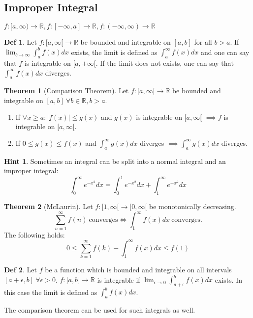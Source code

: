 \documentclass[a4paper, 10pt]{article}
\theoremstyle{definition}
\newtheorem*{definition}{Def}
\newtheorem*{note_wrapper}{Hint}
\theoremstyle{named}
\newtheorem*{ntheorem_wrapper}{Theorem}
\newenvironment{ntheorem}%
    {\begin{mdframed}[style=important]\begin{ntheorem_wrapper}}%
    {\end{ntheorem_wrapper}\end{mdframed}}
\newenvironment{note}%
    {\begin{mdframed}[style=trick]\begin{note_wrapper}}%
    {\end{note_wrapper}\end{mdframed}}
\newcommand{\R}{\mathbb{R}}
\begin{document}
\subsection{Improper Integral}
\begin{center}
    $f: [a, \infty) \to \R, f: [-\infty, a] \to \R, f: (-\infty, \infty) \to \R$
\end{center}

\begin{definition}
    Let $f: [a, \infty[ \to \R$ be bounded and integrable on $[a, b]$ for all $b > a$. If $\lim_{b \to \infty} \int_a^b f(x) dx$ exists, the limit is defined as $\int_a^\infty f(x) dx$ and one can say that $f$ is integrable on $[a, +\infty[$. If the limit does not exists, one can say that $\int_a^\infty f(x) dx$ diverges.
\end{definition}

\begin{ntheorem}[Comparison Theorem]
    Let $f: [a, \infty[ \to \R$ be bounded and integrable on $[a, b] \ \forall b \in \R, b > a$.
    \begin{enumerate}
        \item If $\forall x \geq a : |f(x)| \leq g(x)$ and $g(x)$ is integrable on $[a, \infty[$ $\implies f$ is integrable on $[a, \infty[$.
        \item If $0 \leq g(x) \leq f(x)$ and $\int_a^\infty g(x) dx$ diverges $\implies \int_a^\infty g(x) dx$ diverges.
    \end{enumerate}
\end{ntheorem}

\begin{note}
    Sometimes an integral can be split into a normal integral and an improper integral:
    $$\int_0^\infty e^{-x^2} dx = \int_0^1 e^{-x^2} dx + \int_1^\infty e^{-x^2} dx$$
\end{note}

\begin{ntheorem}[McLaurin]
    Let $f: [1, \infty[ \to [0, \infty[$ be monotonically decreasing.
    $$\sum_{n=1}^\infty f(n) \ \text{converges} \iff \int_1^\infty f(x) dx \ \text{converges}.$$ 
    The following holds:
    $$0 \leq \sum_{k=1}^\infty f(k) - \int_1^\infty f(x) dx \leq f(1)$$
\end{ntheorem}

\begin{definition}
    Let $f$ be a function which is bounded and integrable on all intervals $[a + \epsilon, b] \ \forall \epsilon > 0$. $f: ]a, b] \to \R$ is integrable if $\lim_{\epsilon \to 0} \int_{a + \epsilon}^b f(x) dx$ exists. In this case the limit is defined as $\int_a^b f(x) dx$.
\end{definition}
The comparison theorem can be used for such integrals as well.
\end{document}
